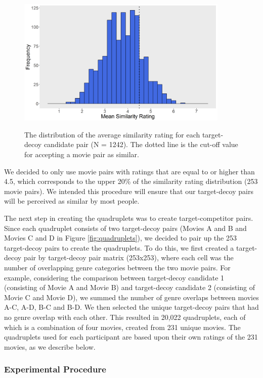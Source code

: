\documentclass[12pt, a4paper]{article}
\begin{document}
\begin{figure}[htb!]
\centering
\captionsetup{justification=centering}
		\caption{The distribution of the average similarity rating for each target-decoy candidate pair (N = 1242). The dotted line is the cut-off value for accepting a movie pair as similar.}
\includegraphics[width=0.9\textwidth]{exp2_pilot.png}
\label{fig:exp2_pilot}
\end{figure}

We decided to only use movie pairs with ratings that are equal to or higher than 4.5, which corresponds to the upper 20\% of the similarity rating distribution (253 movie pairs). We intended this procedure will ensure that our target-decoy pairs will be perceived as similar by most people. 

The next step in creating the quadruplets was to create target-competitor pairs. Since each quadruplet consists of two target-decoy pairs (Movies A and B and Movies C and D in Figure \ref{fig:quadruplets}), we decided to pair up the 253 target-decoy pairs to create the quadruplets. To do this, we first created a target-decoy pair by target-decoy pair matrix (253x253), where each cell was the number of overlapping genre categories between the two movie pairs. For example, considering the comparison between target-decoy candidate 1 (consisting of Movie A and Movie B) and target-decoy candidate 2 (consisting of Movie C and Movie D), we summed the number of genre overlaps between movies A-C, A-D, B-C and B-D. We then selected the unique target-decoy pairs that had no genre overlap with each other. This resulted in 20,022 quadruplets, each of which is a combination of four movies, created from 231 unique movies. The quadruplets used for each participant are based upon their own ratings of the 231 movies, as we describe below.

\subsubsection{Experimental Procedure}
\end{document}
